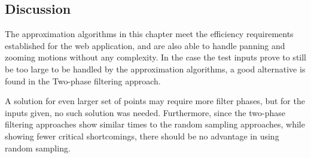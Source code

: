 \begin{change}


\section{Discussion}
The approximation algorithms in this chapter meet the efficiency requirements established for the web application, and are also able to handle panning and zooming motions without any complexity. In the case the test inputs prove to still be too large to be handled by the approximation algorithms, a good alternative is found in the Two-phase filtering approach.

A solution for even larger set of points may require more filter phases, but for the inputs given, no such solution was needed. Furthermore, since the two-phase filtering approaches show similar times to the random sampling approaches, while showing fewer critical shortcomings, there should be no advantage in using random sampling.

\end{change}